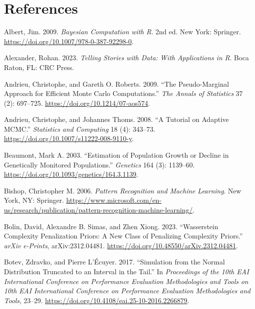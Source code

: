 \documentclass[
  11pt,
  letterpaper,
]{scrbook}
\newlength{\cslhangindent}
\newenvironment{CSLReferences}[2] %
 {\begin{list}{}{%
  \setlength{\itemindent}{0pt}
  \setlength{\leftmargin}{0pt}
  \setlength{\parsep}{0pt}
  \ifodd #1
   \setlength{\leftmargin}{\cslhangindent}
   \setlength{\itemindent}{-1\cslhangindent}
  \fi
  \setlength{\itemsep}{#2\baselineskip}}}
 {\end{list}}
\theoremstyle{plain}
\theoremstyle{plain}
\theoremstyle{plain}
\theoremstyle{definition}
\theoremstyle{definition}
\theoremstyle{definition}
\theoremstyle{remark}
\begin{document}

\chapter{References}\label{references}

\label{refs}
\begin{CSLReferences}{1}{0}
Albert, Jim. 2009. \emph{Bayesian Computation with {R}}. 2nd ed. New
York: Springer. \url{https://doi.org/10.1007/978-0-387-92298-0}.

Alexander, Rohan. 2023. \emph{Telling Stories with Data: With
Applications in {R}}. Boca Raton, FL: CRC Press.

Andrieu, Christophe, and Gareth O. Roberts. 2009. {``The Pseudo-Marginal
Approach for Efficient {M}onte {C}arlo Computations.''} \emph{The Annals
of Statistics} 37 (2): 697--725.
\url{https://doi.org/10.1214/07-aos574}.

Andrieu, Christophe, and Johannes Thoms. 2008. {``A Tutorial on Adaptive
{MCMC}.''} \emph{Statistics and Computing} 18 (4): 343--73.
\url{https://doi.org/10.1007/s11222-008-9110-y}.

Beaumont, Mark A. 2003. {``Estimation of Population Growth or Decline in
Genetically Monitored Populations.''} \emph{Genetics} 164 (3): 1139--60.
\url{https://doi.org/10.1093/genetics/164.3.1139}.

Bishop, Christopher M. 2006. \emph{Pattern Recognition and Machine
Learning}. New York, NY: Springer.
\url{https://www.microsoft.com/en-us/research/publication/pattern-recognition-machine-learning/}.

Bolin, David, Alexandre B. Simas, and Zhen Xiong. 2023. {``{W}asserstein
Complexity Penalization Priors: A New Class of Penalizing Complexity
Priors.''} \emph{arXiv e-Prints}, arXiv:2312.04481.
\url{https://doi.org/10.48550/arXiv.2312.04481}.

Botev, Zdravko, and Pierre L'Écuyer. 2017. {``Simulation from the Normal
Distribution Truncated to an Interval in the Tail.''} In
\emph{Proceedings of the 10th EAI International Conference on
Performance Evaluation Methodologies and Tools on 10th EAI International
Conference on Performance Evaluation Methodologies and Tools}, 23--29.
\url{https://doi.org/10.4108/eai.25-10-2016.2266879}.


\end{CSLReferences}
\end{document}
